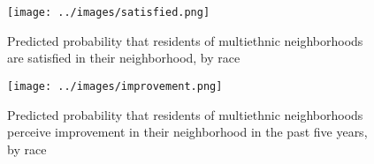 \documentclass[]{article}
\theoremstyle{definition}
\theoremstyle{definition}
\theoremstyle{definition}
\theoremstyle{remark}
\begin{document}
\begin{figure}[h!]
\caption{Predicted probability that residents of multiethnic neighborhoods are satisfied in their neighborhood, by race}
\label{fig:satisfaction}
\texttt{[image: ../images/satisfied.png]}
\end{figure}

\begin{figure}[h!]
\caption{Predicted probability that residents of multiethnic neighborhoods perceive improvement in their neighborhood in the past five years, by race}
\label{fig:improvement}
\texttt{[image: ../images/improvement.png]}
\end{figure}
\end{document}

